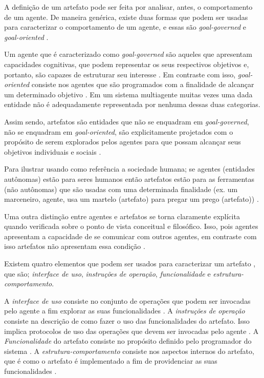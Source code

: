 A definição de um artefato pode ser feita por analisar, antes, o comportamento de um agente. De maneira genérica, existe duas formas que podem ser usadas para caracterizar o comportamento de um agente, e essas são \textit{goal-governed} e \textit{goal-oriented} \cite{relationwithagentprogram} \cite{programingagentartefact}.

Um agente que é caracterizado como \textit{goal-governed} são aqueles que apresentam capacidades cognitivas, que podem representar os seus respectivos objetivos e, portanto, são capazes de estruturar seu interesse \cite{relationwithagentprogram} \cite{programingagentartefact}. Em contraste com isso, \textit{goal-oriented} consiste nos agentes que são programados com a finalidade de alcançar um determinado objetivo \cite{relationwithagentprogram} \cite{programingagentartefact}. Em um sistema multiagente muitas vezes
uma dada entidade não é adequadamente representada por nenhuma dessas duas categorias. 

Assim sendo, artefatos são entidades que não se enquadram em  \textit{goal-governed}, não se enquadram em \textit{goal-oriented}, são explicitamente projetados com o propósito de serem explorados pelos agentes para que possam alcançar seus objetivos individuais e sociais \cite{programingagentartefact} \cite{cartago}. 

Para ilustrar usando como referência a sociedade humana; se agentes (entidades autônomas) estão para seres humanos então artefatos estão para as ferramentas (não autônomas) que são usadas com uma determinada finalidade (ex. um marceneiro, agente, usa um martelo (artefato) para pregar um prego (artefato)) \cite{programingagentartefact}.

Uma outra distinção entre agentes e artefatos se torna claramente explícita quando verificada sobre o ponto de vista conceitual e filosófico. Isso, pois agentes apresentam a capacidade de se comunicar com outros agentes, em contraste com isso artefatos não apresentam essa condição \cite{programingagentartefact}.

Existem quatro elementos que podem ser usados para caracterizar um artefato \cite{programingagentartefact}, que são; \textit{interface de uso}, \textit{instruções de operação}, \textit{funcionalidade} e \textit{estrutura-comportamento}.

A \textit{interface de uso} consiste no conjunto de operações que podem ser invocadas pelo agente a fim explorar as suas funcionalidades \cite{programingagentartefact}. A \textit{instruções de operação} consiste na descrição de como fazer o uso das funcionalidades do artefato. Isso implica protocolos de uso das operações que devem ser invocadas pelo agente \cite{programingagentartefact}. A \textit{Funcionalidade} do artefato consiste no propósito definido pelo programador do sistema \cite{programingagentartefact}. A \textit{estrutura-comportamento} consiste nos aspectos internos do artefato, que é como o artefato é implementado a fim de providenciar as suas funcionalidades \cite{programingagentartefact}.    

